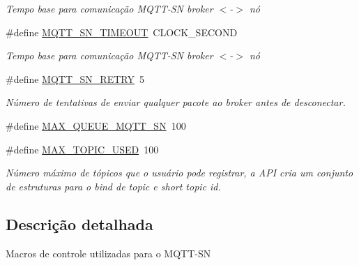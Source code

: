\begin{DoxyCompactItemize}
\begin{DoxyCompactList}\small\item\em Tempo base para comunicação M\+Q\+T\+T-\/\+S\+N broker $<$-\/$>$ nó \end{DoxyCompactList}\item 
\hypertarget{group__Macros_ga47da8d46176b160b0db00fe221725d4c}{\#define \hyperlink{group__Macros_ga47da8d46176b160b0db00fe221725d4c}{M\+Q\+T\+T\+\_\+\+S\+N\+\_\+\+T\+I\+M\+E\+O\+U\+T}~C\+L\+O\+C\+K\+\_\+\+S\+E\+C\+O\+N\+D}\label{group__Macros_ga47da8d46176b160b0db00fe221725d4c}

\begin{DoxyCompactList}\small\item\em Tempo base para comunicação M\+Q\+T\+T-\/\+S\+N broker $<$-\/$>$ nó \end{DoxyCompactList}\item 
\hypertarget{group__Macros_gaad5ac7de3008d8fa37447193aebc31e2}{\#define \hyperlink{group__Macros_gaad5ac7de3008d8fa37447193aebc31e2}{M\+Q\+T\+T\+\_\+\+S\+N\+\_\+\+R\+E\+T\+R\+Y}~5}\label{group__Macros_gaad5ac7de3008d8fa37447193aebc31e2}

\begin{DoxyCompactList}\small\item\em Número de tentativas de enviar qualquer pacote ao broker antes de desconectar. \end{DoxyCompactList}\item 
\#define \hyperlink{group__Macros_ga45ab5881e190d570f3784e50be2cce65}{M\+A\+X\+\_\+\+Q\+U\+E\+U\+E\+\_\+\+M\+Q\+T\+T\+\_\+\+S\+N}~100
\item 
\hypertarget{group__Macros_ga5ed98e8fc00194886ebc14d25540f81b}{\#define \hyperlink{group__Macros_ga5ed98e8fc00194886ebc14d25540f81b}{M\+A\+X\+\_\+\+T\+O\+P\+I\+C\+\_\+\+U\+S\+E\+D}~100}\label{group__Macros_ga5ed98e8fc00194886ebc14d25540f81b}

\begin{DoxyCompactList}\small\item\em Número máximo de tópicos que o usuário pode registrar, a A\+P\+I cria um conjunto de estruturas para o bind de topic e short topic id. \end{DoxyCompactList}\end{DoxyCompactItemize}


\subsection{Descrição detalhada}
Macros de controle utilizadas para o M\+Q\+T\+T-\/\+S\+N 

